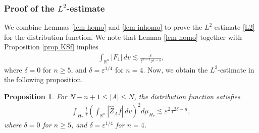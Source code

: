 \documentclass{article}
\newtheorem{proposition}{Proposition}[section]
\newcommand{\bbr}{{\mathbb R}}
\newcommand{\bbrn}{{\bbr^n}}
\begin{document}
%
\subsubsection{Proof of the $ L^2 $-estimate}
We combine Lemmas \ref{lem homo} and \ref{lem inhomo} to prove the $ L^2 $-estimate \eqref{L2} for the distribution function. We note that Lemma \ref{lem homo} together with Proposition \ref{prop KSf} implies
\begin{align}
\int_\bbrn | F_1 | \, d v \lesssim \frac{ \varepsilon }{ t^{ n - 1 } \tau^{ 1 - \delta } } , \label{Fest}
\end{align}
where $ \delta = 0 $ for $ n \geq 5 $, and $ \delta = \varepsilon^{ 1 / 4 } $ for $ n = 4 $. Now, we obtain the $ L^2 $-estimate in the following proposition.


%
\begin{proposition}
For $ N - n + 1 \leq | A | \leq N $, the distribution function satisfies
\begin{align*}
\int_{ H_\tau } \frac{ t }{ \tau } \left( \int_\bbrn | \hat{ Z }_A f | \, d v \right)^2 d \mu_{ H_\tau } \lesssim \varepsilon^2 \tau^{ 2 \delta - n } ,
\end{align*}
where $ \delta = 0 $ for $ n \geq 5 $, and $ \delta = \varepsilon^{ 1 / 4 } $ for $ n = 4 $.
\end{proposition}
%
\end{document}
